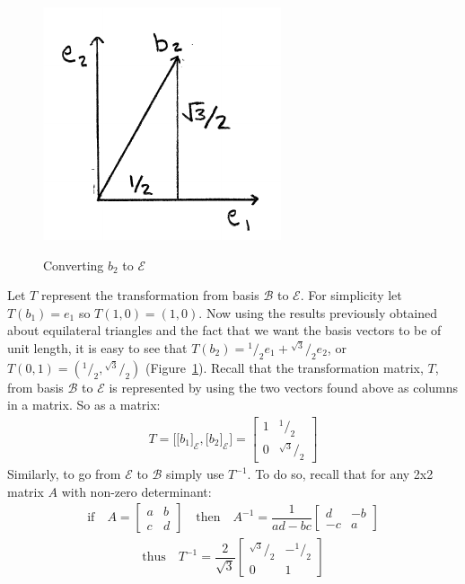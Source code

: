 \documentclass[12pt,letter]{article}
\newcommand*\rfrac[2]{{}^{#1}\!/_{#2}}
\begin{document}
%
\begin{figure}
	\centering
	\caption{Converting $b_2$ to $\mathcal{E}$}
	\includegraphics[width=.3\textwidth]{basis_convert.pdf}
	\vspace{-5pt}
	\label{fig:basis_convert}
\end{figure}
%
Let $T$ represent the transformation from basis $\mathcal{B}$ to $\mathcal{E}$. For simplicity let $T(b_1) = e_1$ so $T(1,0) = (1,0)$. Now using the results previously obtained about equilateral triangles and the fact that we want the basis vectors to be of unit length, it is easy to see that $T(b_2) = \rfrac{1}{2} e_1 + \rfrac {\sqrt{3}}{2} e_2$, or $T(0,1) = (\rfrac{1}{2} , \rfrac{\sqrt{3}}{2})$ (Figure~\ref{fig:basis_convert}). Recall that the transformation matrix, $T$, from basis $\mathcal{B}$ to $\mathcal{E}$ is represented by using the two vectors found above as columns in a matrix. So as a matrix:
%
\begin{align*}
	T = \bigg[ \big[b_1\big]_\mathcal{E} , \big[b_2\big]_\mathcal{E}  \bigg]
	= \begin{bmatrix}
		1 &  \rfrac{1}{2}\\
		0 & \rfrac{\sqrt{3}}{2}
	\end{bmatrix}	
\end{align*}
%
Similarly, to go from $\mathcal{E}$ to $\mathcal{B}$ simply use $T^{-1}$. To do so, recall that for any 2x2 matrix $A$ with non-zero determinant:
%
\begin{align*}
	\text{if} \quad A =
	\begin{bmatrix}
		a & b \\
		c & d
	\end{bmatrix}
	\quad \text{then} \quad A^{-1} = \dfrac{1}{ad-bc}
	\begin{bmatrix}
		d & -b \\
		-c & a
	\end{bmatrix}
\end{align*} \vspace{-25pt}
%
\begin{align*}
	\text{thus} \quad T^{-1} = \dfrac{2}{\sqrt{3}}
	\begin{bmatrix}
		\rfrac{\sqrt{3}}{2} & -\rfrac{1}{2} \\
		0 & 1
	\end{bmatrix}
\end{align*}
\end{document}
